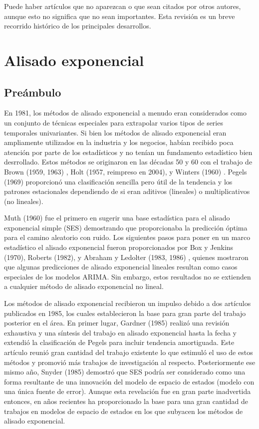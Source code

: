 \documentclass{llncs}
\begin{document}
Puede haber artículos que no aparezcan o que sean citados por otros autores, aunque esto no significa que no sean importantes. Esta revisión es un breve recorrido histórico de los principales desarrollos. 

\section{Alisado exponencial}
\subsection{Preámbulo}
En 1981, los métodos de alisado exponencial a menudo eran considerados como un conjunto de técnicas especiales para extrapolar varios tipos de series temporales univariantes. Si bien los métodos de alisado exponencial eran ampliamente utilizados en la industria y los negocios, habían recibido poca atención por parte de los estadísticos y no tenían un fundamento estadístico bien desrrollado. Estos métodos se originaron en las décadas 50 y 60 con el trabajo de Brown (1959, 1963) \cite{Brown1959} \cite{Brown1963}, Holt (1957, reimpreso en 2004)\cite{Holt20045}, y Winters (1960) \cite{Winters1960324}. Pegels (1969) \cite{Pegels1969311} proporcionó una clasificación sencilla pero útil de la tendencia y los patrones estacionales dependiendo de si eran aditivos (lineales)  o multiplicativos (no lineales).

Muth (1960) \cite{Muth1960299}  fue el primero en sugerir una base estadística para el alisado exponencial simple (SES) demostrando que proporcionaba la predicción óptima para el camino aleatorio con ruido. Los siguientes pasos para poner en un marco estadístico el alisado exponencial fueron proporcionados por Box y Jenkins (1970), Roberts (1982)\cite{Roberts1982808}, y Abraham y Ledolter (1983, 1986) \cite{Abraham1983}\cite{Abraham198651}, quienes mostraron que algunas predicciones de alisado exponencial lineales resultan como casos especiales de los modelos ARIMA. Sin embargo, estos resultados no se extienden a cualquier método de alisado exponencial no lineal.

Los métodos de alisado exponencial recibieron un impulso debido a dos artículos publicados en 1985, los cuales establecieron la base para gran parte del trabajo posterior en el área. En primer lugar, Gardner (1985) \cite{GardnerES19851} realizó una revisión exhaustiva y una síntesis del trabajo en alisado exponencial hasta la fecha y extendió la clasificación de Pegels para incluir  tendencia amortiguada. Este artículo reunió gran cantidad del trabajo existente lo que estimuló el uso de estos métodos y promovió más trabajos de investigación al respecto. Posteriormente ese mismo año, Snyder (1985) \cite{Snyder1985272} demostró que SES podría ser considerado como una forma resultante de una innovación del modelo de espacio de estados (modelo con una única fuente de error). Aunque esta revelación fue en gran parte inadvertida entonces, en años recientes ha proporcionado la base para una gran cantidad de trabajos en modelos de espacio de estados en los que subyacen  los métodos de alisado exponencial.
\end{document}
